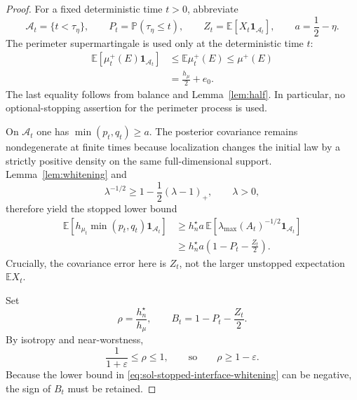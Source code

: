 \documentclass[../main.tex]{subfiles}
\begin{document}
\begin{proof}
For a fixed deterministic time $t>0$, abbreviate
\[
  \mathcal A_t=\{t<\tau_\eta\},\qquad
  P_t=\mathbb P(\tau_\eta\leq t),\qquad
  Z_t=\mathbb E[X_t\mathbf1_{\mathcal A_t}],
  \qquad a=\frac12-\eta.
\]
The perimeter supermartingale is used only at the deterministic time $t$:
\begin{equation}
\begin{split}
  \mathbb E[\mu_t^+(E)\mathbf1_{\mathcal A_t}]
  &\leq\mathbb E\mu_t^+(E)\leq\mu^+(E)\\
  &=\frac{h_\mu}{2}+e_0.
\end{split}
\label{eq:sol-stopped-interface-perimeter}
\end{equation}
The last equality follows from balance and Lemma~\ref{lem:half}.  In particular, no
optional-stopping assertion for the perimeter process is used.

On $\mathcal A_t$ one has $\min(p_t,q_t)\geq a$.  The posterior covariance remains
nondegenerate at finite times because localization changes the initial law by a strictly
positive density on the same full-dimensional support.  Lemma~\ref{lem:whitening} and
\begin{equation}
  \lambda^{-1/2}\geq1-\frac12(\lambda-1)_+,
  \qquad \lambda>0,
  \label{eq:sol-stopped-interface-tangent}
\end{equation}
therefore yield the stopped lower bound
\begin{equation}
\begin{split}
  \mathbb E\!\left[
      h_{\mu_t}\min(p_t,q_t)\mathbf1_{\mathcal A_t}\right]
  &\geq h_n^\star a\,
      \mathbb E\!\left[
        \lambda_{\max}(A_t)^{-1/2}\mathbf1_{\mathcal A_t}\right]\\
  &\geq h_n^\star a\left(1-P_t-\frac{Z_t}{2}\right).
\end{split}
\label{eq:sol-stopped-interface-whitening}
\end{equation}
Crucially, the covariance error here is $Z_t$, not the larger unstopped expectation
$\mathbb E X_t$.

Set
\[
  \rho=\frac{h_n^\star}{h_\mu},
  \qquad B_t=1-P_t-\frac{Z_t}{2}.
\]
By isotropy and near-worstness,
\begin{equation}
  \frac1{1+\varepsilon}\leq\rho\leq1,
  \qquad\text{so}\qquad \rho\geq1-\varepsilon.
  \label{eq:sol-stopped-interface-rho}
\end{equation}
Because the lower bound in \eqref{eq:sol-stopped-interface-whitening} can be negative,
the sign of $B_t$ must be retained.


\end{proof}
\end{document}
